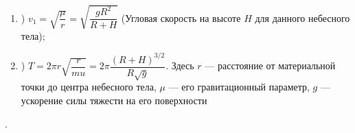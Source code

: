\begin{enumerate} \item) $v_1 = \sqrt{\dfrac{\mu}{r}} =
\sqrt{\dfrac{gR^2}{R + H}}$
(Угловая скорость на высоте $H$ для данного небесного тела);
\item) $T = 2\pi r\sqrt{\dfrac{r}{mu}} =2\pi\dfrac{(R+H)^{ 3/2 }}{R\sqrt{g}}$.
Здесь $r$ --- расстояние от материальной точки до центра небесного тела,
$\mu$ --- его гравитационный параметр, $g$ ---
ускорение силы тяжести на его поверхности
\end{enumerate}.
